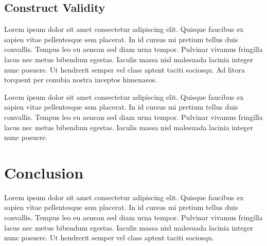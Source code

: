\documentclass[sigconf,nonacm]{acmart} %
\begin{document}
\subsection{Construct Validity}
\label{subsec:construct_validity}

Lorem ipsum dolor sit amet consectetur adipiscing elit. 
Quisque faucibus ex sapien vitae pellentesque sem placerat. 
In id cursus mi pretium tellus duis convallis. 
Tempus leo eu aenean sed diam urna tempor. 
Pulvinar vivamus fringilla lacus nec metus bibendum egestas. 
Iaculis massa nisl malesuada lacinia integer nunc posuere. 
Ut hendrerit semper vel class aptent taciti sociosqu. 
Ad litora torquent per conubia nostra inceptos himenaeos.

Lorem ipsum dolor sit amet consectetur adipiscing elit. 
Quisque faucibus ex sapien vitae pellentesque sem placerat. 
In id cursus mi pretium tellus duis convallis. 
Tempus leo eu aenean sed diam urna tempor. 
Pulvinar vivamus fringilla lacus nec metus bibendum egestas. 
Iaculis massa nisl malesuada lacinia integer nunc posuere. 

\section{Conclusion}
\label{sec:conclusion}

Lorem ipsum dolor sit amet consectetur adipiscing elit. 
Quisque faucibus ex sapien vitae pellentesque sem placerat. 
In id cursus mi pretium tellus duis convallis. 
Tempus leo eu aenean sed diam urna tempor. 
Pulvinar vivamus fringilla lacus nec metus bibendum egestas. 
Iaculis massa nisl malesuada lacinia integer nunc posuere. 
Ut hendrerit semper vel class aptent taciti sociosqu.
\end{document}
